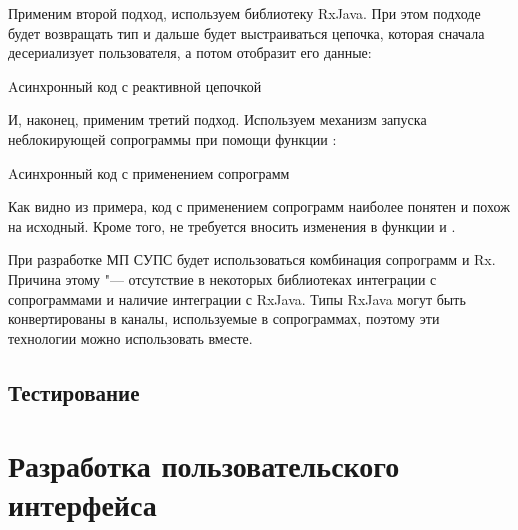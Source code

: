 Применим второй подход, используем библиотеку RxJava.
При этом подходе  будет возвращать тип  и дальше будет выстраиваться цепочка, которая сначала десериализует пользователя, а потом отобразит его данные:

\begin{listing}[H]
  \caption{Aсинхронный код с реактивной цепочкой}
  \label{lst:asyncKtRx}
\end{listing}

И, наконец, применим третий подход.
Используем механизм запуска неблокирующей сопрограммы при помощи функции :

\begin{listing}[H]
  \caption{Aсинхронный код с применением сопрограмм}
  \label{lst:asyncKtCoroutines}
\end{listing}

Как видно из примера, код с применением сопрограмм наиболее понятен и похож на исходный.
Кроме того, не требуется вносить изменения в функции  и .

При разработке МП СУПС будет использоваться комбинация сопрограмм и Rx.
Причина этому "--- отсутствие в некоторых библиотеках интеграции с сопрограммами и наличие интеграции с RxJava.
Типы RxJava могут быть конвертированы в каналы, используемые в сопрограммах, поэтому эти технологии можно использовать вместе.

\subsection{Тестирование}
\label{subsec:testing}

\section{Разработка пользовательского интерфейса}
\label{sec:gui}

\conclusions
\label{sec:designConclusions}
